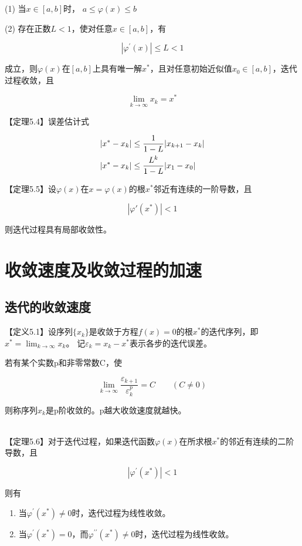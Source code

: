 \documentclass[12pt]{report}
\begin{document}
\qquad \qquad \quad (1) 当$x \in [a, b]$时， $a \leq \varphi(x) \leq b$

\qquad \qquad \quad (2) 存在正数$L < 1$，使对任意$x \in [a,b]$，有

\[
	|\varphi^{\prime}(x)|\leq L <1
\]

成立，则$\varphi(x)$在$[a, b]$上具有唯一解$x^*$，且对任意初始近似值$x_0 \in [a,b]$，迭代过程收敛，且

\[
	\lim_{k \to \infty}x_k = x^*
\]

【定理5.4】误差估计式

\begin{equation}
	\begin{aligned}
		|x^* - x_k| &\leq \frac{1}{1-L}|x_{k+1} - x_k|\\
		|x^* - x_k| &\leq \frac{L^k}{1-L}|x_1 - x_0|
	\end{aligned}
	\notag
\end{equation}


【定理5.5】设$\varphi(x)$在$x=\varphi(x)$的根$x^*$邻近有连续的一阶导数，且

\[
	|\varphi'(x^*)| < 1
\]

则迭代过程具有局部收敛性。


\section{收敛速度及收敛过程的加速}

\subsection{迭代的收敛速度}

【定义5.1】设序列$\{x_k\}$是收敛于方程$f(x) = 0$的根$x^*$的迭代序列，即$x^* = \lim_{k \to \infty}x_k$。
记$\varepsilon_k = x_k - x^*$表示各步的迭代误差。

若有某个实数p和非零常数C，使

\[
	\lim_{k \to \infty} \frac{\varepsilon_{k+1}}{\varepsilon_{k}^p} = C \quad \quad (C \neq 0)
\]

则称序列${x_k}$是p阶收敛的。p越大收敛速度就越快。

~\\

【定理5.6】对于迭代过程，如果迭代函数$\varphi(x)$在所求根$x^*$的邻近有连续的二阶导数，且

\[
	|\varphi^\prime(x^*)| < 1
\]

则有

\begin{enumerate}
	\item 当$\varphi^\prime(x^*) \neq 0$时，迭代过程为线性收敛。
	\item 当$\varphi^\prime(x^*) = 0$，而$\varphi^{\prime\prime}(x^*) \neq 0$时，迭代过程为线性收敛。
\end{enumerate}
\end{document}
